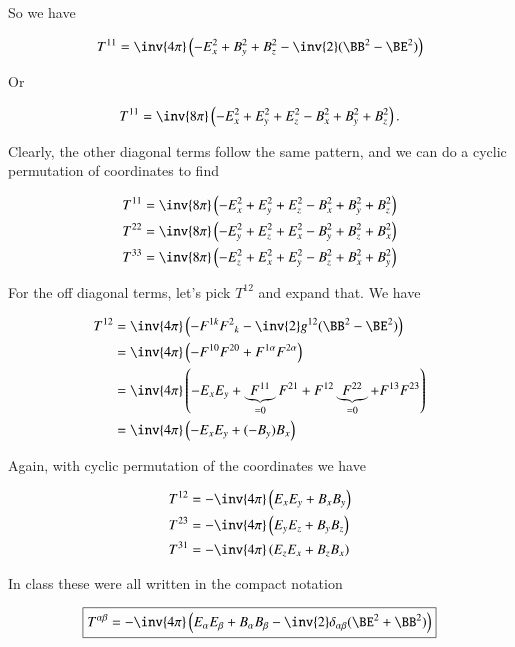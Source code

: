 So we have

\begin{equation}\label{eqn:relativisticElectrodynamicsPS6:240}
T^{1 1} 
= \inv{4 \pi} \left( 
- E_x^2 + B_y^2 + B_z^2
- \inv{2} (\BB^2 - \BE^2) \right)
\end{equation}

Or

\begin{equation}\label{eqn:relativisticElectrodynamicsPS6:260}
T^{1 1} 
= \inv{8 \pi} \left( 
- E_x^2 + E_y^2 + E_z^2
- B_x^2 + B_y^2 + B_z^2
\right).
\end{equation}

Clearly, the other diagonal terms follow the same pattern, and we can do a cyclic permutation of coordinates to find

\begin{align}\label{eqn:relativisticElectrodynamicsPS6:280}
T^{1 1} &= \inv{8 \pi} \left( - E_x^2 + E_y^2 + E_z^2 - B_x^2 + B_y^2 + B_z^2 \right) \\
T^{2 2} &= \inv{8 \pi} \left( - E_y^2 + E_z^2 + E_x^2 - B_y^2 + B_z^2 + B_x^2 \right) \\
T^{3 3} &= \inv{8 \pi} \left( - E_z^2 + E_x^2 + E_y^2 - B_z^2 + B_x^2 + B_y^2 \right) 
\end{align}

For the off diagonal terms, let's pick $T^{1 2}$ and expand that.  We have

\begin{align*}
T^{1 2} 
&= \inv{4 \pi} \left( - F^{1 k} {F^2}_k - \inv{2} g^{1 2}(\BB^2 - \BE^2) \right) \\
&= \inv{4 \pi} \left( - F^{1 0} F^{2 0} + F^{1 \alpha} F^{2 \alpha} \right) \\
&= \inv{4 \pi} \left( - E_x E_y 
+ \underbrace{F^{1 1}}_{=0} F^{2 1} 
+ F^{1 2} \underbrace{F^{2 2}}_{=0}
+ F^{1 3} F^{2 3} 
\right) \\
&= \inv{4 \pi} \left( - E_x E_y + (-B_y) B_x \right) \\
\end{align*}

Again, with cyclic permutation of the coordinates we have

\begin{align}\label{eqn:relativisticElectrodynamicsPS6:300}
T^{1 2} &= -\inv{4 \pi} \left( E_x E_y + B_x B_y \right) \\
T^{2 3} &= -\inv{4 \pi} \left( E_y E_z + B_y B_z \right) \\
T^{3 1} &= -\inv{4 \pi} \left( E_z E_x + B_z B_x \right) 
\end{align}

In class these were all written in the compact notation

\begin{equation}\label{eqn:relativisticElectrodynamicsPS6:320}
\boxed{
T^{\alpha \beta} = -\inv{4 \pi} \left( 
E_\alpha E_\beta 
+B_\alpha B_\beta 
- \inv{2} \delta_{\alpha\beta} (\BE^2 + \BB^2) \right)
}
\end{equation}

\EndArticle
